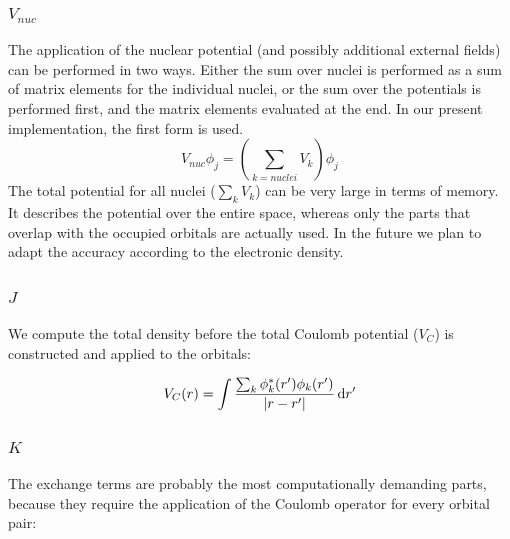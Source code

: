 \documentclass{article}
\begin{document}
\subsubsection{$V_{nuc}$}

The application of the nuclear potential (and possibly additional external fields) can be performed in two ways. Either the sum over nuclei is performed as a sum of matrix elements for the individual nuclei, or the sum over the potentials is performed first, and the matrix elements evaluated at the end. In our present implementation, the first form is used.
\begin{equation}
  V_{nuc} \phi_j = (\sum_{k = nuclei} V_k) \phi_j
\end{equation}
The total potential for all nuclei ($\sum_{k} V_k$) can be very large in terms of memory. It describes the potential over the entire space, whereas only the parts that overlap with the occupied orbitals are actually used. In the future we plan to adapt the accuracy according to the electronic density.




\subsubsection{$J$}

We compute the total density before the total Coulomb potential ($V_C$) is constructed and applied to the orbitals:

\begin{equation}
  V_{C}(r) = \int \frac{\sum_k \phi^*_k(r')\phi_k(r')}{|r-r'|} \,\mathrm{d} r'
\end{equation}

\subsubsection{$K$}

The exchange terms are probably the most computationally demanding parts, because they require the application of the Coulomb operator for every orbital pair:
\end{document}
